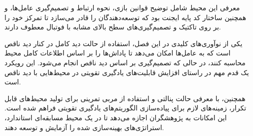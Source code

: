 معرفی این محیط شامل توضیح قوانین بازی، نحوه ارتباط و تصمیم‌گیری عامل‌ها، و همچنین ساختار کد پایه ایجنت بود که توسعه‌دهندگان را قادر می‌سازد تا تمرکز خود را بر روی تاکتیک و تصمیم‌گیری‌های سطح بالای مشابه با فوتبال معطوف دارند.

یکی از نوآوری‌های کلیدی در این فصل، استفاده از حالت دید کامل در کنار دید ناقص است که به عامل‌ها امکان می‌دهد تا پاداش‌ها را بر اساس اطلاعات کامل محیط محاسبه کنند، در حالی که تصمیم‌گیری بر اساس دید ناقص انجام می‌شود. این رویکرد یک قدم مهم در راستای افزایش قابلیت‌های یادگیری تقویتی در محیط‌هایی با دید ناقص است.

همچنین، با معرفی حالت پنالتی و استفاده از مربی تمرینی برای تولید محیط‌های قابل تکرار، زمینه‌های لازم برای پیاده‌سازی الگوریتم‌های یادگیری تقویتی فراهم شده است. این امکانات به پژوهشگران اجازه می‌دهد تا در یک محیط مسابقه‌ای استاندارد، استراتژی‌های بهینه‌سازی شده را آزمایش و توسعه دهند.